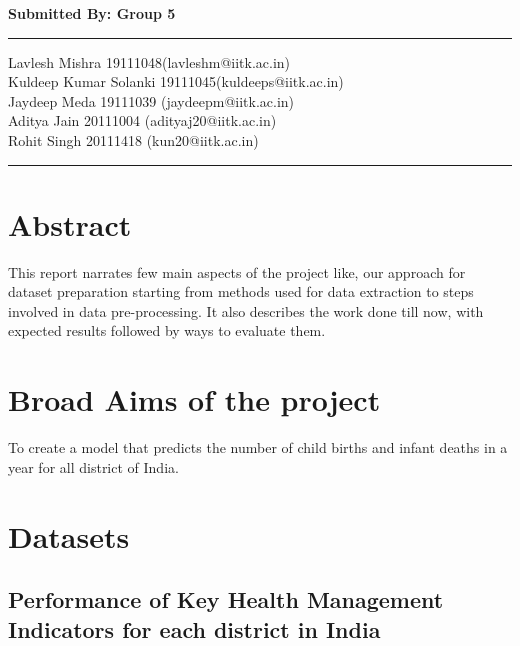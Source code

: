 \documentclass[]{article}
\begin{document}
\restoregeometry
\begin{titlepage}
    \begin{center}
        \begin{center}
        \textbf{\Large Submitted By: Group 5}\\
        \end{center}
        
        \medskip
        
        \vspace{1cm}
        \rule{\textwidth}{2pt}
        \large{Lavlesh Mishra \hfill 19111048(lavleshm@iitk.ac.in)}\\
        \large{Kuldeep Kumar Solanki \hfill 19111045(kuldeeps@iitk.ac.in)}\\
        \large{Jaydeep Meda \hfill 19111039 (jaydeepm@iitk.ac.in)}\\
        \large{Aditya Jain \hfill 20111004 (adityaj20@iitk.ac.in)}\\
        \large{Rohit Singh \hfill 20111418 (kun20@iitk.ac.in)}\\
        \medskip
        \rule{\textwidth}{2pt}
    \end{center}
\end{titlepage}
\newpage
\tableofcontents
\newpage
\section{Abstract}
\justifying
This report narrates few main aspects of the project like, our approach for dataset preparation starting from methods used for data extraction to steps involved in data pre-processing. It also describes the work done till now, with expected results followed by ways to evaluate them.
        
\section{Broad Aims of the project}
To create a model that predicts the number of child births and infant deaths in a year for all district of India.

\section{Datasets}
\subsection{Performance of Key Health Management Indicators for each district in India}
        
\end{document}

